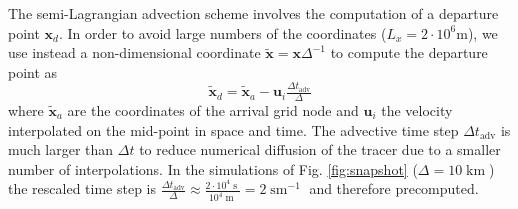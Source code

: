 \documentclass[draft]{agujournal2019}
\newcommand{\op}{\operatorname}
\begin{document}
The semi-Lagrangian advection scheme involves the computation of a departure point $\mathbf{x}_d$. In order to avoid large numbers of the coordinates ($L_x = 2 \cdot 10^6$m), we use instead a non-dimensional coordinate $\mathbf{\tilde{x}} = \mathbf{x}\Delta^{-1}$ to compute the departure point as 
\begin{equation}
\mathbf{\tilde{x}}_d = \mathbf{\tilde{x}}_a - \mathbf{u}_i \tfrac{\Delta t_\text{adv}}{\Delta}
\end{equation}
where $\mathbf{\tilde{x}}_a$ are the coordinates of the arrival grid node and $\mathbf{u}_i$ the velocity interpolated on the mid-point in space and time\cite{Smolarkiewicz1992}. The advective time step $\Delta t_\text{adv}$ is much larger than $\Delta t$ to reduce numerical diffusion of the tracer due to a smaller number of interpolations. In the simulations of Fig. \ref{fig:snapshot} ($\Delta = 10\op{km}$) the rescaled time step is $\tfrac{\Delta t_\text{adv}}{\Delta} \approx \tfrac{2 \cdot 10^4\op{s}}{10^4\op{m}} =  2 \op{sm}^{-1}$ and therefore precomputed.






%
%
%
%
%
%
%
%
%
%
\end{document}
